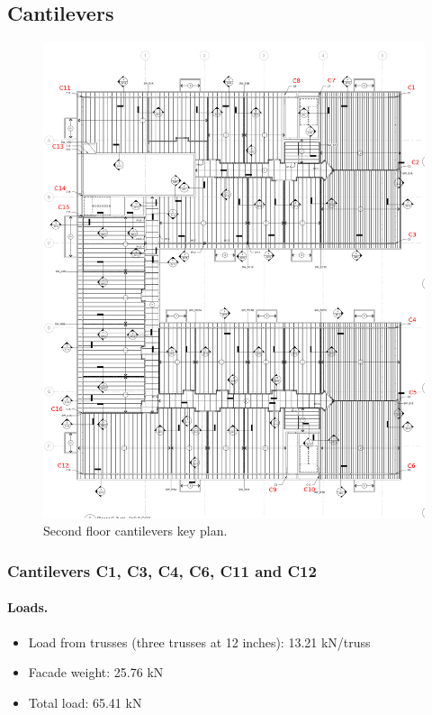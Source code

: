 \subsection{Cantilevers}

\begin{figure}
  \begin{center}
  \includegraphics[width=120mm]{figures/cantilevers_key_plan}
  \end{center}
  \caption{Second floor cantilevers key plan.}\label{fg_2nd_floor_cantilevers_key_plan}
\end{figure}

\subsubsection{Cantilevers C1, C3, C4, C6, C11 and C12}

\paragraph{Loads.}

\begin{itemize}
\item Load from trusses (three trusses at 12 inches): 13.21 kN/truss
\item Facade weight: 25.76 kN
\item Total load: 65.41 kN
\end{itemize}

